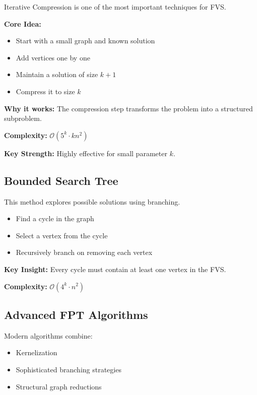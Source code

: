 \documentclass[10pt,a4paper]{report}
\theoremstyle{definition}
\newcommand{\fvs}{\textsc{FVS}}
\newcommand{\bigO}[1]{\mathcal{O}\!\left(#1\right)}
\begin{document}
Iterative Compression is one of the most important techniques for \fvs{}.

\textbf{Core Idea:}
\begin{itemize}
  \item Start with a small graph and known solution
  \item Add vertices one by one
  \item Maintain a solution of size $k+1$
  \item Compress it to size $k$
\end{itemize}

\textbf{Why it works:} The compression step transforms the problem into a structured subproblem.

\textbf{Complexity:} $\bigO{5^k \cdot k n^2}$

\textbf{Key Strength:} Highly effective for small parameter $k$.

\subsection{Bounded Search Tree}

This method explores possible solutions using branching.

\begin{itemize}
  \item Find a cycle in the graph
  \item Select a vertex from the cycle
  \item Recursively branch on removing each vertex
\end{itemize}

\textbf{Key Insight:} Every cycle must contain at least one vertex in the FVS.

\textbf{Complexity:} $\bigO{4^k \cdot n^2}$

\subsection{Advanced FPT Algorithms}

Modern algorithms combine:
\begin{itemize}
  \item Kernelization
  \item Sophisticated branching strategies
  \item Structural graph reductions
\end{itemize}
\end{document}
